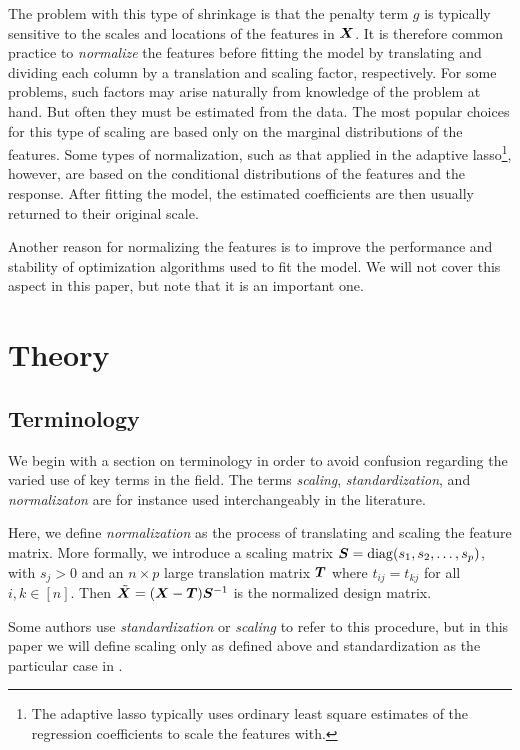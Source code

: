 
The problem with this type of shrinkage is that the penalty term \(g\) is typically sensitive to the scales and locations of the features in \(\mat X\).
It is therefore common practice to \emph{normalize} the features before fitting the model by translating and dividing each column by a translation and scaling factor, respectively.
For some problems, such factors may arise naturally from knowledge of the problem at hand.
But often they must be estimated from the data.
The most popular choices for this type of scaling are based only on the marginal distributions of the features.
Some types of normalization, such as that applied in the adaptive lasso\footnote{The adaptive lasso typically uses ordinary least square estimates of the regression coefficients to scale the features with.}, however, are based on the conditional distributions of the features and the response.
After fitting the model, the estimated coefficients are then usually returned to their original scale.

Another reason for normalizing the features is to improve the performance and stability of optimization algorithms used to fit the model.
We will not cover this aspect in this paper, but note that it is an important one.

\section{Theory}

\subsection{Terminology}

We begin with a section on terminology in order to avoid confusion regarding the varied use of key terms in the field. The terms \emph{scaling}, \emph{standardization}, and \emph{normalizaton} are for instance used interchangeably in the literature.

Here, we define \emph{normalization} as the process of translating and scaling the feature matrix.
More formally, we introduce a scaling matrix \(\mat S = \diag(s_1, s_2, \dots, s_p)\), with \(s_j > 0\) and an \(n \times p\) large translation matrix \(\mat T\) where \(t_{ij} = t_{kj}\) for all \(i,k \in [n]\). Then \(\tilde{\mat X} = (\mat X - \mat T) \mat S^{-1}\) is the normalized design matrix.

Some authors use \emph{standardization} or \emph{scaling} to refer to this procedure, but in this paper we will define scaling only as defined above and standardization as the particular case in .

